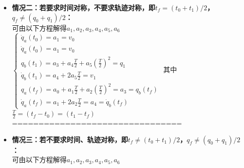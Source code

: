 \documentclass[../main.tex]{subfiles}
\begin{document}
\begin{enumerate}
\begin{enumerate}
{\begin{itemize}
\begin{enumerate}
                    \item \textbf{始末速度：}
                        \begin{itemize}
                            \item 若 $v_0=v_1$，则在 $t_f$ 处速度连续；
                            \item 若 $v_0\neq v_1$，则在 $t_f$ 处速度不连续；
                        \end{itemize}
                \end{enumerate}
            ================================   
             \item \textbf{情况二：若要求时间对称，不要求轨迹对称，即$t_f=(t_0+t_1)/2$，$q_f\neq(q_0+q_1)/2$：}
             \\可由以下方程解得$a_1,a_2,a_3,a_4,a_5,a_6$
            \( \left\{  \begin{array}{l} {\dot{q}}_{a}\left( {t}_{0}\right)  = {a}_{1} = {v}_{0} \\  {\dot{q}}_{a}\left( {t}_{0}\right)  = {a}_{1} = {v}_{0} \\  {q}_{b}\left( {t}_{1}\right)  = {a}_{3} + {a}_{4}\frac{T}{2} + {a}_{5}{\left( \frac{T}{2}\right) }^{2} = {q}_{1} \\  {\dot{q}}_{b}\left( {t}_{1}\right)  = {a}_{4} + 2{a}_{5}\frac{T}{2} = {v}_{1} \\  {q}_{a}\left( {t}_{f}\right)  = {a}_{0} + {a}_{1}\frac{T}{2} + {a}_{2}{\left( \frac{T}{2}\right) }^{2} = {a}_{3} = {q}_{b}\left( t_f\right) \\  {\dot{q}}_{a}\left( {t}_{f}\right)  = {a}_{1} + 2{a}_{2}\frac{T}{2} = {a}_{4} = {\dot{q}}_{b}\left( {t}_{f}\right)  \end{array}\right. \)
            其中 \( \frac{T}{2} = \left( {{t}_{f} - {t}_{0}}\right)  = \left( {{t}_{1} - {t}_{f}}\right) \)
            \\================================   
             \item \textbf{情况三：若不要求时间、轨迹对称，即$t_f\neq(t_0+t_1)/2$，$q_f\neq(q_0+q_1)/2$：}             
            \\可由以下方程解得$a_1,a_2,a_3,a_4,a_5,a_6$

\end{itemize}}
\end{enumerate}
\end{enumerate}
\end{document}
